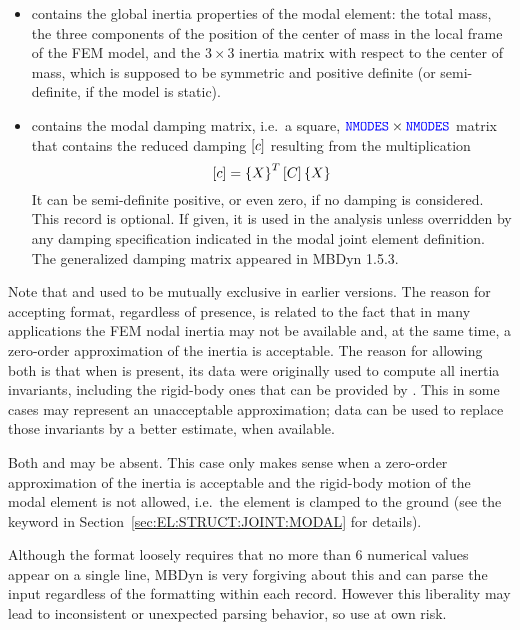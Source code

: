 \begin{itemize}
\item {} contains the global inertia properties
of the modal element: the total mass, the three components 
of the position of the center of mass in the local frame
of the FEM model, and the $3\times{3}$ inertia matrix
with respect to the center of mass, which is supposed
to be symmetric and positive definite (or semi-definite,
if the model is static).

\item {} contains the modal damping matrix,
i.e.\ a square, $\textcolor{blue}{\texttt{NMODES}} \times \textcolor{blue}{\texttt{NMODES}}$ matrix that contains
the reduced damping $\left[ c \right]$ resulting from the multiplication
\begin{equation}
	\left[ c \right] = \left\{ X \right\}^T \left[ C \right] \left\{ X \right\}
\end{equation}
It can be semi-definite positive, or even zero, if no damping is considered.
This record is optional.
If given, it is used in the analysis unless overridden by any damping
specification indicated in the modal joint element definition.
The generalized damping matrix appeared in MBDyn 1.5.3.

\end{itemize}

Note that  and 
used to be mutually exclusive in earlier versions.
The reason for accepting  format,
regardless of  presence, is related
to the fact that in many applications the FEM nodal inertia
may not be available and, at the same time, a zero-order approximation
of the inertia is acceptable.
The reason for allowing both is that when 
is present, its data were originally used to compute all inertia invariants,
including the rigid-body ones that can be provided by .
This in some cases may represent an unacceptable approximation;
 data can be used to replace those invariants
by a better estimate, when available.

Both  and  may be absent.
This case only makes sense when a zero-order approximation
of the inertia is acceptable and the rigid-body motion
of the modal element is not allowed, i.e.\ the element is clamped
to the ground (see the keyword 
in Section~\ref{sec:EL:STRUCT:JOINT:MODAL} for details).


Although the format loosely requires that no more than 6 numerical values 
appear on a single line, MBDyn is very forgiving about this and can parse
the input regardless of the formatting within each record.
However this liberality may lead to inconsistent or unexpected parsing
behavior, so use at own risk.



